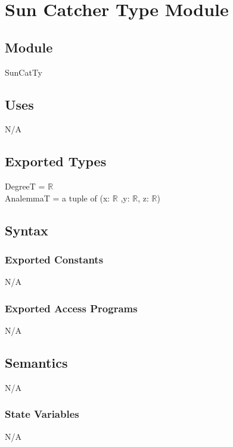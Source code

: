 \documentclass[12pt, titlepage]{article}
\begin{document}

\section{Sun Catcher Type Module} \label{ModuleSCTM} 

\subsection{Module}
SunCatTy

\subsection{Uses}

N/A\\

\subsection{Exported Types}

DegreeT = $\mathbb{R}$\\
AnalemmaT = a tuple of (x: $\mathbb{R}$ ,y: $\mathbb{R}$, z: $\mathbb{R}$)\\

\subsection{Syntax}

\subsubsection{Exported Constants}
N/A\\

\subsubsection{Exported Access Programs}
N/A\\

\subsection{Semantics}
N/A\\
\subsubsection{State Variables}
N/A\\
\end{document}
